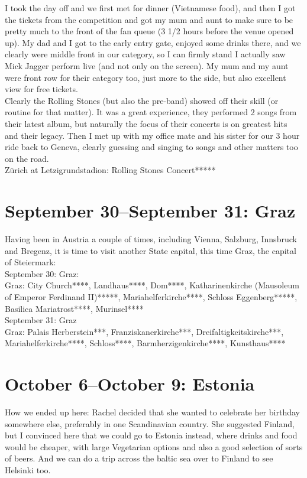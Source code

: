I took the day off and we first met for dinner (Vietnamese food), and then I got the tickets from the competition and got my mum and aunt to make sure to be pretty much to the front of the fan queue (3 1/2 hours before the venue opened up). My dad and I got to the early entry gate, enjoyed some drinks there, and we clearly were middle front in our category, so I can firmly stand I actually saw Mick Jagger perform live (and not only on the screen). My mum and my aunt were front row for their category too, just more to the side, but also excellent view for free tickets.\\
Clearly the Rolling Stones (but also the pre-band) showed off their skill (or routine for that matter). It was a great experience, they performed 2 songs from their latest album, but naturally the focus of their concerts is on greatest hits and their legacy. Then I met up with my office mate and his sister for our 3 hour ride back to Geneva, clearly guessing and singing to songs and other matters too on the road.\\

Z\"urich at Letzigrundstadion: Rolling Stones Concert*****

\section{September 30--September 31: Graz}
\label{Graz2017}

Having been in Austria a couple of times, including Vienna, Salzburg, Innsbruck and Bregenz, it is time to visit another State capital, this time Graz, the capital of Steiermark:\\

September 30: Graz:\\
Graz: City Church****, Landhaus****, Dom****, Katharinenkirche (Mausoleum of Emperor Ferdinand II)*****, Mariahelferkirche****, Schloss Eggenberg*****, Basilica Mariatrost****, Murinsel****\\

September 31: Graz\\
Graz: Palais Herberstein***, Franziskanerkirche***, Dreifaltigkeitskirche***, Mariahelferkirche****, Schloss****, Barmherzigenkirche****, Kunsthaus****

\section{October 6--October 9: Estonia}
\label{Estonia2017}

How we ended up here: Rachel decided that she wanted to celebrate her birthday somewhere else, preferably in one Scandinavian country. She suggested Finland, but I convinced here that we could go to Estonia instead, where drinks and food would be cheaper, with large Vegetarian options and also a good selection of sorts of beers. And we can do a trip across the baltic sea over to Finland to see Helsinki too.\\

